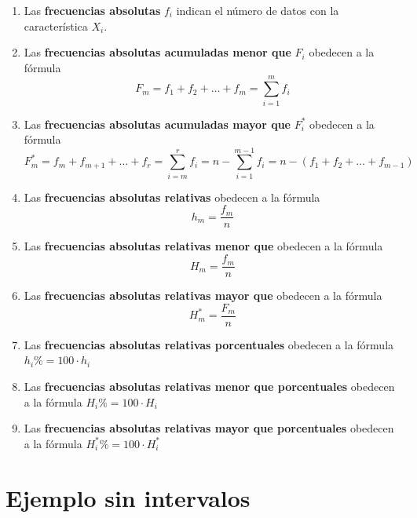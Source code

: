 \documentclass[
  10pt,
]{krantz}
\theoremstyle{definition}
\theoremstyle{definition}
\theoremstyle{definition}
\theoremstyle{definition}
\theoremstyle{remark}
\begin{document}
\begin{enumerate}
\def\labelenumi{\arabic{enumi}.}
\item
  Las \textbf{frecuencias absolutas} \(f_i\) indican el número de datos con la característica \(X_i\).
\item
  Las \textbf{frecuencias absolutas acumuladas menor que} \(F_i\) obedecen a la fórmula
  \[F_m=f_1+f_2+\ldots+f_m=\sum_{i=1}^mf_i\]
\item
  Las \textbf{frecuencias absolutas acumuladas mayor que} \(F_i^*\) obedecen a la fórmula
  \[F_m^*=f_m+f_{m+1}+\ldots+f_r=\sum_{i=m}^rf_i=n-\sum_{i=1}^{m-1}f_i=n-\left(f_1+f_{2}+\ldots+f_{m-1}\right)\]
\item
  Las \textbf{frecuencias absolutas relativas} obedecen a la fórmula
  \[h_m=\frac{f_m}{n}\]
\item
  Las \textbf{frecuencias absolutas relativas menor que} obedecen a la fórmula
  \[H_m=\frac{f_m}{n}\]
\item
  Las \textbf{frecuencias absolutas relativas mayor que} obedecen a la fórmula
  \[H_m^*=\frac{F_m}{n}\]
\item
  Las \textbf{frecuencias absolutas relativas porcentuales} obedecen a la fórmula
  \(h_i\%=100\cdot h_i\)
\item
  Las \textbf{frecuencias absolutas relativas menor que porcentuales} obedecen a la fórmula
  \(H_i\%=100\cdot H_i\)
\item
  Las \textbf{frecuencias absolutas relativas mayor que porcentuales} obedecen a la fórmula
  \(H_i^*\%=100\cdot H_i^*\)
\end{enumerate}

\hypertarget{ejemplo-sin-intervalos}{%
\section{Ejemplo sin intervalos}\label{ejemplo-sin-intervalos}}
\end{document}
